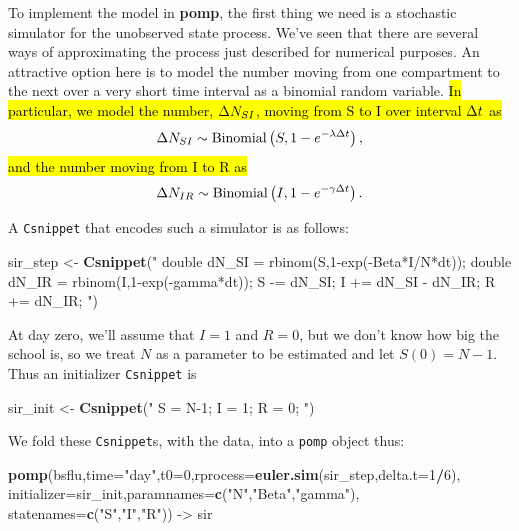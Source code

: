 \documentclass[]{article}
\newenvironment{Shaded}{\begin{snugshade}}{\end{snugshade}}
\newcommand{\KeywordTok}[1]{\textcolor[rgb]{0.13,0.29,0.53}{\textbf{#1}}}
\newcommand{\DataTypeTok}[1]{\textcolor[rgb]{0.13,0.29,0.53}{#1}}
\newcommand{\DecValTok}[1]{\textcolor[rgb]{0.00,0.00,0.81}{#1}}
\newcommand{\StringTok}[1]{\textcolor[rgb]{0.31,0.60,0.02}{#1}}
\newcommand{\OperatorTok}[1]{\textcolor[rgb]{0.81,0.36,0.00}{\textbf{#1}}}
\newcommand{\NormalTok}[1]{#1}
\begin{document}
To implement the model in \textbf{pomp}, the first thing we need is a
stochastic simulator for the unobserved state process. We've seen that
there are several ways of approximating the process just described for
numerical purposes. An attractive option here is to model the number
moving from one compartment to the next over a very short time interval
as a binomial random variable. \hl{In particular, we model the number,
$\Delta{N_{SI}}$, moving from S to I over interval $\Delta{t}$ as}
\[\Delta{N_{SI}} \sim \mathrm{Binomial}\left(S,1-e^{-\lambda\Delta{t}}\right),\] \hl{and
the number moving from I to R as}
\[\Delta{N_{IR}} \sim \mathrm{Binomial}\left(I,1-e^{-\gamma\Delta{t}}\right).\]

A \texttt{Csnippet} that encodes such a simulator is as follows:

\begin{Shaded}
\begin{Highlighting}[]
\NormalTok{sir_step <-}\StringTok{ }\KeywordTok{Csnippet}\NormalTok{(}\StringTok{"}
\StringTok{  double dN_SI = rbinom(S,1-exp(-Beta*I/N*dt));}
\StringTok{  double dN_IR = rbinom(I,1-exp(-gamma*dt));}
\StringTok{  S -= dN_SI;}
\StringTok{  I += dN_SI - dN_IR;}
\StringTok{  R += dN_IR;}
\StringTok{"}\NormalTok{)}
\end{Highlighting}
\end{Shaded}

At day zero, we'll assume that \(I=1\) and \(R=0\), but we don't know
how big the school is, so we treat \(N\) as a parameter to be estimated
and let \(S(0)=N-1\). Thus an initializer \texttt{Csnippet} is

\begin{Shaded}
\begin{Highlighting}[]
\NormalTok{sir_init <-}\StringTok{ }\KeywordTok{Csnippet}\NormalTok{(}\StringTok{"}
\StringTok{  S = N-1;}
\StringTok{  I = 1;}
\StringTok{  R = 0;}
\StringTok{"}\NormalTok{)}
\end{Highlighting}
\end{Shaded}

We fold these \texttt{Csnippet}s, with the data, into a \texttt{pomp}
object thus:

\begin{Shaded}
\begin{Highlighting}[]
\KeywordTok{pomp}\NormalTok{(bsflu,}\DataTypeTok{time=}\StringTok{"day"}\NormalTok{,}\DataTypeTok{t0=}\DecValTok{0}\NormalTok{,}\DataTypeTok{rprocess=}\KeywordTok{euler.sim}\NormalTok{(sir_step,}\DataTypeTok{delta.t=}\DecValTok{1}\OperatorTok{/}\DecValTok{6}\NormalTok{),}
     \DataTypeTok{initializer=}\NormalTok{sir_init,}\DataTypeTok{paramnames=}\KeywordTok{c}\NormalTok{(}\StringTok{"N"}\NormalTok{,}\StringTok{"Beta"}\NormalTok{,}\StringTok{"gamma"}\NormalTok{),}
     \DataTypeTok{statenames=}\KeywordTok{c}\NormalTok{(}\StringTok{"S"}\NormalTok{,}\StringTok{"I"}\NormalTok{,}\StringTok{"R"}\NormalTok{)) ->}\StringTok{ }\NormalTok{sir}
\end{Highlighting}
\end{Shaded}
\end{document}
